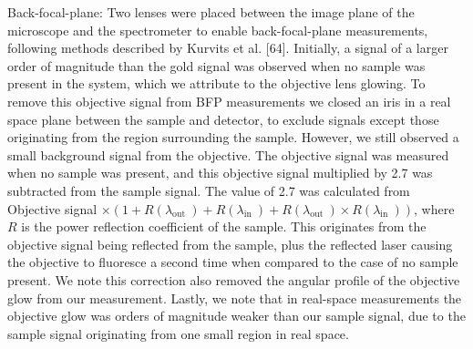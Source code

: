 \documentclass[10pt]{article}
\begin{document}
Back-focal-plane: Two lenses were placed between the image plane of the microscope and the spectrometer to enable back-focal-plane measurements, following methods described by Kurvits et al. [64]. Initially, a signal of a larger order of magnitude than the gold signal was observed when no sample was present in the system, which we attribute to the objective lens glowing. To remove this objective signal from BFP measurements we closed an iris in a real space plane between the sample and detector, to exclude signals except those originating from the region surrounding the sample. However, we still observed a small background signal from the objective. The objective signal was measured when no sample was present, and this objective signal multiplied by 2.7 was subtracted from the sample signal. The value of 2.7 was calculated from Objective signal $\times\left(1+R\left(\lambda_{\text {out }}\right)+\right. \left.R\left(\lambda_{\text {in }}\right)+R\left(\lambda_{\text {out }}\right) \times R\left(\lambda_{\text {in }}\right)\right)$, where $R$ is the power reflection coefficient of the sample. This originates from the objective signal being reflected from the sample, plus the reflected laser causing the objective to fluoresce a second time when compared to the case of no sample present. We note this correction also removed the angular profile of the objective glow from our measurement. Lastly, we note that in real-space measurements the objective glow was orders of magnitude weaker than our sample signal, due to the sample signal originating from one small region in real space.
\end{document}
